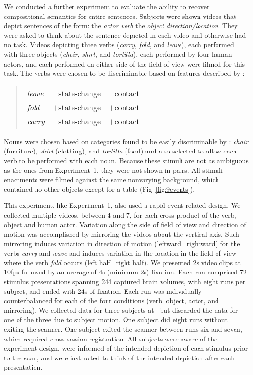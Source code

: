 We conducted a further experiment to evaluate the ability to recover
compositional semantics for entire sentences.
%
Subjects were shown videos that depict sentences of the form: the \emph{actor}
\emph{verb} the \emph{object} \emph{direction/location}.
%
They were asked to think about the sentence depicted in each video and
otherwise had no task.
%
Videos depicting three verbs (\emph{carry}, \emph{fold}, and \emph{leave}),
each performed with three objects (\emph{chair}, \emph{shirt}, and
\emph{tortilla}), each performed by four human actors, and each performed on
either side of the field of view were filmed for this task.
%
The verbs were chosen to be discriminable based on features described by
\citet{kemmerer2008}:
%
\begin{quote}
  \vspace{-1ex}
  \begin{tabular}{lrr}
    \emph{leave} & $-$state-change & $-$contact\\
    \emph{fold}  & $+$state-change & $+$contact\\
    \emph{carry} & $-$state-change & $+$contact\\
  \end{tabular}
  \vspace{-1ex}
\end{quote}
%
\noindent
%
Nouns were chosen based on categories found to be easily discriminable
by \citet{just2010}: \emph{chair} (furniture), \emph{shirt} (clothing), and
\emph{tortilla} (food) and also selected to allow each verb to be performed
with each noun.
%
Because these stimuli are not as ambiguous as the ones from Experiment~1,
they were not shown in pairs.
%
All stimuli enactments were filmed against the same nonvarying background,
which contained no other objects except for a table (Fig~\ref{fig:9events}).

This experiment, like Experiment~1, also used a rapid event-related
design.
%
We collected multiple videos, between 4 and 7, for each cross product of the
verb, object and human actor.
%
Variation along the side of field of view and direction of motion was
accomplished by mirroring the videos about the vertical axis.
%
Such mirroring induces variation in direction of motion (leftward
\vs\ rightward) for the verbs \emph{carry} and \emph{leave} and induces
variation in the location in the field of view where the verb \emph{fold} occurs
(left half \vs\ right half).
%
We presented 2s video clips at 10fps followed by an average of 4s (minimum 2s)
fixation.
%
Each run comprised 72 stimulus presentations spanning 244 captured brain
volumes, with eight runs per subject, and ended with 24s of fixation.
%
Each run was individually counterbalanced for each of the four conditions
(verb, object, actor, and mirroring).
%
We collected data for three subjects at \Purdue\ but discarded the
data for one of the three due to subject motion.
%
One subject did eight runs without exiting the scanner.
%
One subject exited the scanner between runs six and seven, which required
cross-session registration.
%
All subjects were aware of the experiment design, were informed of the intended
depiction of each stimulus prior to the scan, and were instructed to think of
the intended depiction after each presentation.

